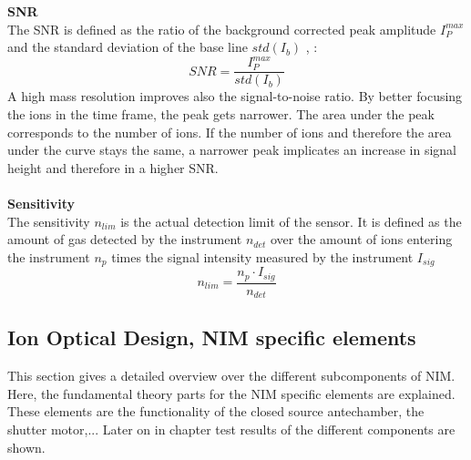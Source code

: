 	\textbf{SNR}\\ %
	The SNR is defined as the ratio of the background corrected peak amplitude $I^{max}_P$ and the standard deviation of the base line $std(I_b)$ \cite{Agilent_TechNote_SNR}, \cite{Master_Meyer}: %
	\begin{equation}
		SNR = \frac{I^{max}_P}{std(I_b)}
		\label{eq:SNR}
	\end{equation}
	A high mass resolution improves also the signal-to-noise ratio. By better focusing the ions in the time frame, the peak gets narrower. The area under the peak corresponds to the number of ions. If the number of ions and therefore the area under the curve stays the same, a narrower peak implicates an increase in signal height and therefore in a higher SNR.\\ %
	\\
	\textbf{Sensitivity} \\ %
	The sensitivity $n_{lim}$ is the actual detection limit of the sensor. It is defined as the amount of gas detected by the instrument $n_{det}$ over the amount of ions entering the instrument $n_{p}$ times the signal intensity measured by the instrument $I_{sig}$
	\begin{equation}
		n_{lim} = \frac{n_p \cdot I_{sig}}{n_{det}}
	\end{equation}
	
	

	
	\subsection{Ion Optical Design, NIM specific elements } %
	This section gives a detailed overview over the different subcomponents of NIM. Here, the fundamental theory parts for the NIM specific elements are explained. These elements are the functionality of the closed source antechamber, the shutter motor,...
	Later on in chapter  test results of the different components are shown.
	
